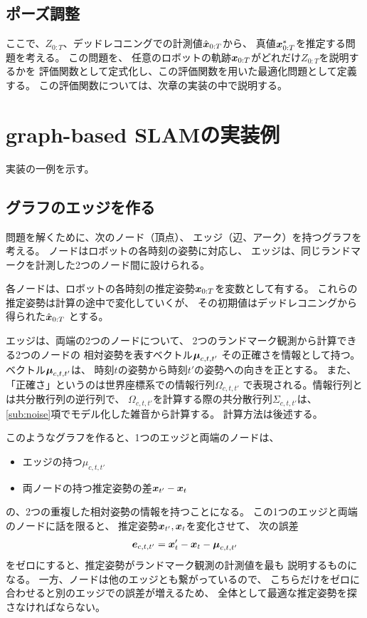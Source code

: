 \subsection{ポーズ調整}\label{sub:fullslam}

ここで、$Z_{0:T}$、デッドレコニングでの計測値$\hat{\boldsymbol{x}}_{0:T}$から、
真値$\boldsymbol{x}_{0:T}^*$を推定する問題を考える。
この問題を、
任意のロボットの軌跡$\boldsymbol{x}_{0:T}$がどれだけ$Z_{0:T}$を説明するかを
評価関数として定式化し、この評価関数を用いた最適化問題として定義する。
この評価関数については、次章の実装の中で説明する。


\section{graph-based SLAMの実装例}

実装の一例を示す。

\subsection{グラフのエッジを作る}

問題を解くために、次のノード（頂点）、
エッジ（辺、アーク）を持つグラフを考える。
ノードはロボットの各時刻の姿勢に対応し、
エッジは、同じランドマークを計測した2つのノード間に設けられる。

各ノードは、ロボットの各時刻の推定姿勢$\boldsymbol{x}_{0:T}$を変数として有する。
これらの推定姿勢は計算の途中で変化していくが、
その初期値はデッドレコニングから得られた$\hat{\boldsymbol{x}}_{0:T}$
とする。

エッジは、両端の2つのノードについて、
2つのランドマーク観測から計算できる2つのノードの
相対姿勢を表すベクトル$\boldsymbol{\mu}_{c,t,t'}$
その正確さを情報として持つ。
ベクトル$\boldsymbol{\mu}_{c,t,t'}$は、
時刻$t$の姿勢から時刻$t'$の姿勢への向きを正とする。
また、「正確さ」というのは世界座標系での情報行列$\Omega_{c,t,t'}$
で表現される。情報行列とは共分散行列の逆行列で、
$\Omega_{c,t,t'}$を計算する際の共分散行列$\Sigma_{c,t,t'}$は、
\ref{sub:noise}項でモデル化した雑音から計算する。
計算方法は後述する。

このようなグラフを作ると、1つのエッジと両端のノードは、
\begin{itemize}
	\item エッジの持つ$\mu_{c,t,t'}$
	\item 両ノードの持つ推定姿勢の差$\boldsymbol{x}_{t'} - \boldsymbol{x}_t$
\end{itemize}
の、2つの重複した相対姿勢の情報を持つことになる。
この1つのエッジと両端のノードに話を限ると、
推定姿勢$\boldsymbol{x}_{t'},\boldsymbol{x}_t$を変化させて、
次の誤差
\begin{align}
	\boldsymbol{e}_{c,t,t'} = \boldsymbol{x}_t' - \boldsymbol{x}_t - \boldsymbol{\mu}_{c,t,t'}\label{eq:e}
\end{align}
をゼロにすると、推定姿勢がランドマーク観測の計測値を最も
説明するものになる。
一方、ノードは他のエッジとも繋がっているので、
こちらだけをゼロに合わせると別のエッジでの誤差が増えるため、
全体として最適な推定姿勢を探さなければならない。




